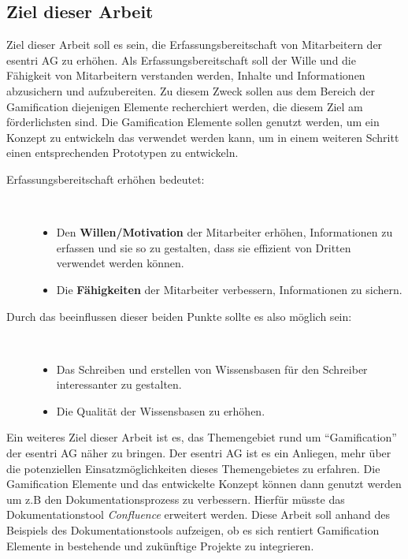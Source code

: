\documentclass[a4paper,12pt]{scrartcl}
\begin{document}
\subsection{Ziel dieser Arbeit} 
Ziel dieser Arbeit soll es sein, die Erfassungsbereitschaft von Mitarbeitern der esentri AG zu erhöhen. Als Erfassungsbereitschaft soll der Wille und die Fähigkeit von Mitarbeitern verstanden werden, Inhalte und Informationen abzusichern und aufzubereiten. Zu diesem Zweck sollen aus dem Bereich der Gamification diejenigen Elemente recherchiert werden, die diesem Ziel am förderlichsten sind. Die Gamification Elemente sollen genutzt werden, um ein Konzept zu entwickeln das verwendet werden kann, um in einem weiteren Schritt einen entsprechenden Prototypen zu entwickeln.
\begin{description}
   \item[Erfassungsbereitschaft erhöhen bedeutet:]~\par
   \begin{itemize}
      \item Den \textbf{Willen/Motivation} der Mitarbeiter erhöhen, Informationen zu erfassen und sie so zu gestalten, dass sie effizient von Dritten verwendet werden können.  
      \item Die \textbf{Fähigkeiten} der Mitarbeiter verbessern, Informationen zu sichern.
   \end{itemize}
\end{description}

\begin{description}
   \item[Durch das beeinflussen dieser beiden Punkte sollte es also möglich sein:]~\par
   \begin{itemize}
      \item Das Schreiben und erstellen von Wissensbasen für den Schreiber interessanter zu gestalten.  
      \item Die Qualität der Wissensbasen zu erhöhen.
   \end{itemize}
\end{description}
Ein weiteres Ziel dieser Arbeit ist es, das Themengebiet rund um \enquote{Gamification} der esentri AG näher zu bringen. Der esentri AG ist es ein Anliegen, mehr über die potenziellen Einsatzmöglichkeiten dieses Themengebietes zu erfahren. Die Gamification Elemente und das entwickelte Konzept können dann genutzt werden um z.B den Dokumentationsprozess zu verbessern. Hierfür müsste das Dokumentationstool \textit{Confluence} erweitert werden. Diese Arbeit soll anhand des Beispiels des Dokumentationstools aufzeigen, ob es sich rentiert Gamification Elemente in bestehende und zukünftige Projekte zu integrieren.  
\end{document}
